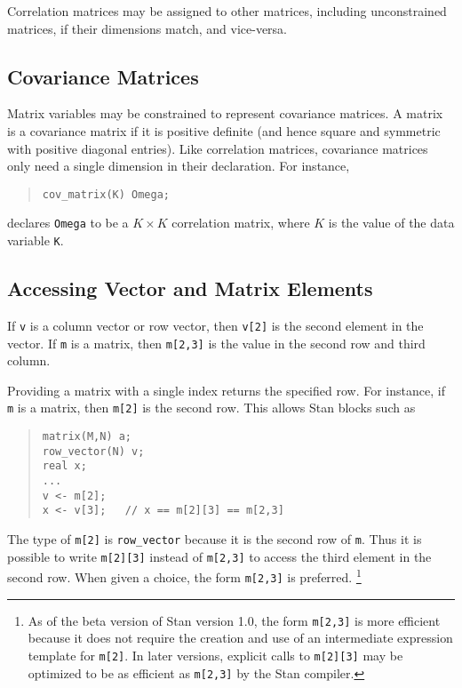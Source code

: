 \documentclass[10pt]{report}
\newcommand{\Stan}{Stan\xspace}
\newcommand{\code}[1]{{\tt #1}}
\begin{document}
Correlation matrices may be assigned to other matrices, including
unconstrained matrices, if their dimensions match, and vice-versa.

\subsection{Covariance Matrices}

Matrix variables may be constrained to represent covariance matrices.
A matrix is a covariance matrix if it is positive definite (and hence
square and symmetric with positive diagonal entries).  Like
correlation matrices, covariance matrices only need a single dimension
in their declaration.  For instance,
%
\begin{quote}
\begin{Verbatim} 
cov_matrix(K) Omega;
\end{Verbatim}
\end{quote}
% 
declares \code{Omega} to be a $K \times K$ correlation matrix, where
$K$ is the value of the data variable \code{K}.

\subsection{Accessing Vector and Matrix Elements}

If \code{v} is a column vector or row vector, then \code{v[2]} is the
second element in the vector.  If \code{m} is a matrix, then
\code{m[2,3]} is the value in the second row and third column.

Providing a matrix with a single index returns the specified row.  For
instance, if \code{m} is a matrix, then \code{m[2]} is the second row.
This allows \Stan blocks such as
%
\begin{quote}
\begin{Verbatim} 
matrix(M,N) a;    
row_vector(N) v;    
real x;
...
v <- m[2];   
x <- v[3];   // x == m[2][3] == m[2,3]
\end{Verbatim}
\end{quote}
% 
The type of \code{m[2]} is \code{row\_vector} because it is the second
row of \code{m}.  Thus it is possible to write \code{m[2][3]} instead
of \code{m[2,3]} to access the third element in the second row.  When
given a choice, the form \code{m[2,3]} is preferred.%
%
\footnote{As of the beta version of \Stan version 1.0, the form
  \code{m[2,3]} is more efficient because it does not require the
  creation and use of an intermediate expression template for
  \code{m[2]}.  In later versions, explicit calls to \code{m[2][3]}
  may be optimized to be as efficient as \code{m[2,3]} by the \Stan
  compiler.}
\end{document}
